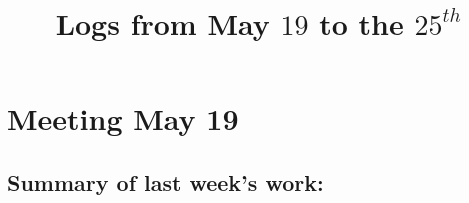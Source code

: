 \documentclass[12pt,a4paper]{article}
\title{Logs from May $19$ to the $25^{th}$}
\author{}
\date{}
\begin{document}
\maketitle

\section{Meeting May 19}

\subsection{Summary of last week's work:}




\end{document}

